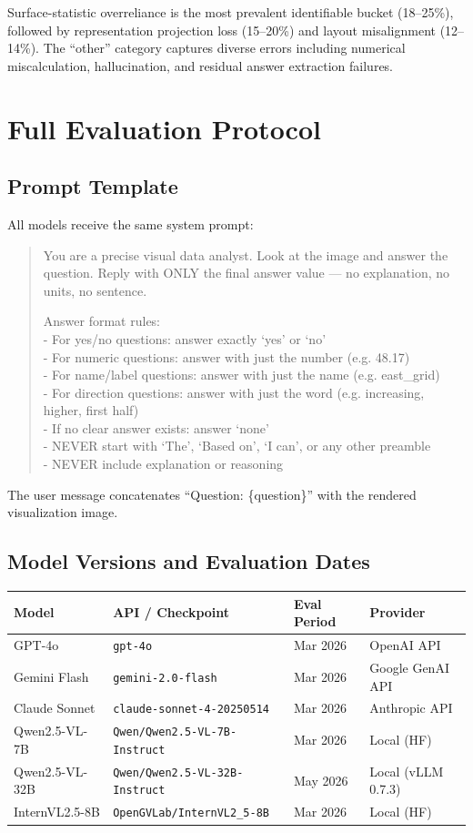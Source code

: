 \documentclass{article}
\begin{document}
Surface-statistic overreliance is the most prevalent identifiable bucket (18--25\%), followed by representation projection loss (15--20\%) and layout misalignment (12--14\%). The ``other'' category captures diverse errors including numerical miscalculation, hallucination, and residual answer extraction failures.

\section{Full Evaluation Protocol}
\label{sec:eval_protocol}

\subsection{Prompt Template}
All models receive the same system prompt:

\begin{quote}
\small\ttfamily
You are a precise visual data analyst. Look at the image and answer the question. Reply with ONLY the final answer value --- no explanation, no units, no sentence.

Answer format rules:\\
- For yes/no questions: answer exactly `yes' or `no'\\
- For numeric questions: answer with just the number (e.g. 48.17)\\
- For name/label questions: answer with just the name (e.g. east\_grid)\\
- For direction questions: answer with just the word (e.g. increasing, higher, first half)\\
- If no clear answer exists: answer `none'\\
- NEVER start with `The', `Based on', `I can', or any other preamble\\
- NEVER include explanation or reasoning
\end{quote}

The user message concatenates ``Question: \{question\}'' with the rendered visualization image.

\subsection{Model Versions and Evaluation Dates}
\begin{tabular}{llll}
\toprule
Model & API / Checkpoint & Eval Period & Provider \\
\midrule
GPT-4o & \texttt{gpt-4o} & Mar 2026 & OpenAI API \\
Gemini Flash & \texttt{gemini-2.0-flash} & Mar 2026 & Google GenAI API \\
Claude Sonnet & \texttt{claude-sonnet-4-20250514} & Mar 2026 & Anthropic API \\
Qwen2.5-VL-7B & \texttt{Qwen/Qwen2.5-VL-7B-Instruct} & Mar 2026 & Local (HF) \\
Qwen2.5-VL-32B & \texttt{Qwen/Qwen2.5-VL-32B-Instruct} & May 2026 & Local (vLLM 0.7.3) \\
InternVL2.5-8B & \texttt{OpenGVLab/InternVL2\_5-8B} & Mar 2026 & Local (HF) \\
\bottomrule
\end{tabular}
\end{document}
